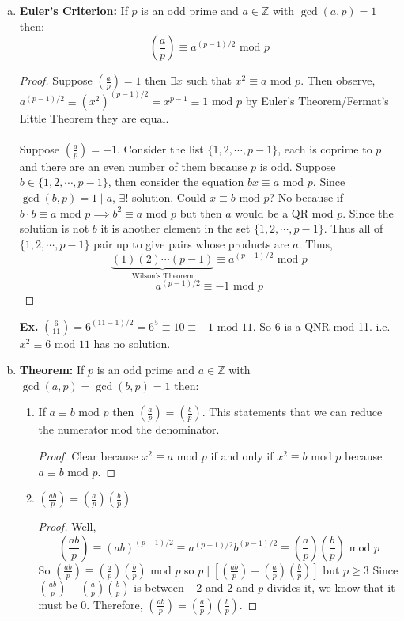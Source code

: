 \documentclass[class=article, crop=false]{standalone}
\def\integers{{\mathbb Z}}
\begin{document}
\begin{enumerate}[1.]
\begin{enumerate}[(a)]
	\item \textbf{Euler's Criterion:} If $p$ is an odd prime and $a\in\integers$ with $\gcd(a,p)=1$
	then: $$\left(\frac{a}{p}\right) \equiv a^{(p-1)/2} \mbox{ mod } p$$
	\begin{proof}
		Suppose $\left(\frac{a}{p}\right)=1$ then $\exists x$ such that $x^2 \equiv a \mbox{ mod } p$. Then observe,
		$a^{(p-1)/2} \equiv (x^2)^{(p-1)/2} = x^{p-1} \equiv 1 \mbox{ mod }p$
		by Euler's Theorem/Fermat's Little Theorem they are equal. \\\\
		Suppose $\left(\frac{a}{p}\right)=-1$. Consider the list $\{1,2,\cdots, p-1\}$, each is coprime to $p$
		and there are an even number of them because $p$ is odd. Suppose $b\in\{1,2,\cdots, p-1\}$, then
		consider the equation $bx \equiv a\mbox{ mod } p$. Since $\gcd(b,p)=1\mid a$, $\exists !$ solution.
		Could $x\equiv b\mbox{ mod }p$? No because if $b\cdot b \equiv a \mbox{ mod }p \implies b^2 \equiv a\mbox{ mod }p$
		but then $a$ would be a QR mod $p$. Since the solution is not $b$ it is another element in the set
		$\{1,2,\cdots, p-1\}$. Thus all of $\{1,2,\cdots, p-1\}$ pair up to give pairs whose products are $a$.
		Thus, $$\underbrace{(1)(2)\cdots(p-1)}_{\text{Wilson's Theorem}} \equiv a^{(p-1)/2} \mbox{ mod }p$$
		$$a^{(p-1)/2}\equiv -1\mbox{ mod }p$$
	\end{proof}
	\noindent\textbf{Ex.} $\left(\frac{6}{11}\right) = 6^{(11-1)/2} = 6^5 \equiv 10 \equiv -1 \mbox{ mod }11$.
	So 6 is a QNR mod 11. i.e. $x^2\equiv 6\mbox{ mod }11$ has no solution.

	\item \textbf{Theorem:} If $p$ is an odd prime and $a\in\integers$ with $\gcd(a,p)=\gcd(b,p)=1$ then:
	\begin{enumerate}
		\item If $a\equiv b\mbox{ mod }p$ then $\left(\frac{a}{p}\right) = \left(\frac{b}{p}\right)$. This statements
		that we can reduce the numerator mod the denominator.
		\begin{proof}
			Clear because $x^2\equiv a\mbox{ mod }p$ if and only if $x^2\equiv b\mbox{ mod } p$ because $a\equiv b\mbox{ mod }p$.
		\end{proof}

		\item $\left(\frac{ab}{p}\right) = \left(\frac{a}{p}\right) \left(\frac{b}{p}\right)$
		\begin{proof}
			Well, $$\left(\frac{ab}{p}\right) \equiv (ab)^{(p-1)/2} \equiv a^{(p-1)/2} b^{(p-1)/2} \equiv \left(\frac{a}{p}\right)
			\left(\frac{b}{p}\right) \mbox{ mod }p$$
			So $\left(\frac{ab}{p}\right)\equiv \left(\frac{a}{p}\right) \left(\frac{b}{p}\right) \mbox{ mod }p$ so 
			$p\mid \left[\left(\frac{ab}{p}\right)- \left(\frac{a}{p}\right) \left(\frac{b}{p}\right)\right]$ but $p\geq 3$
			Since $\left(\frac{ab}{p}\right)- \left(\frac{a}{p}\right) \left(\frac{b}{p}\right)$ is between $-2$ and $2$
			and $p$ divides it, we know that it must be 0. Therefore, 
			$\left(\frac{ab}{p}\right)= \left(\frac{a}{p}\right) \left(\frac{b}{p}\right)$.
		\end{proof}
		

\end{enumerate}
\end{enumerate}
\end{enumerate}
\end{document}
